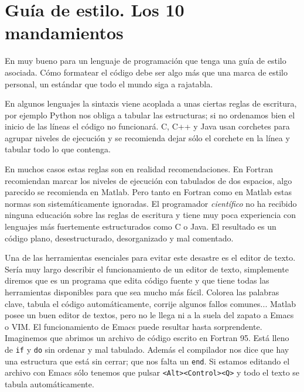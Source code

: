 


\chapter{Guía de estilo. Los 10 mandamientos}


En muy bueno para un lenguaje de programación que tenga una guía de
estilo asociada. Cómo formatear el código debe ser algo más que una
marca de estilo personal, un estándar que todo el mundo siga a
rajatabla.

En algunos lenguajes la sintaxis viene acoplada a unas ciertas reglas
de escritura, por ejemplo Python nos obliga a tabular las estructuras;
si no ordenamos bien el inicio de las líneas el código no funcionará.
C, C++ y Java usan corchetes para agrupar niveles de ejecución y se
recomienda dejar sólo el corchete en la línea y tabular todo lo que
contenga.

En muchos casos estas reglas son en realidad recomendaciones. En
Fortran recomiendan marcar los niveles de ejecución con tabulados de
dos espacios, algo parecido se recomienda en Matlab. Pero tanto en
Fortran como en Matlab estas normas son sistemáticamente ignoradas. El
programador \emph{científico} no ha recibido ninguna educación sobre
las reglas de escritura y tiene muy poca experiencia con lenguajes más
fuertemente estructurados como C o Java. El resultado es un código
plano, desestructurado, desorganizado y mal comentado.

Una de las herramientas esenciales para evitar este desastre es el
editor de texto. Sería muy largo describir el funcionamiento de un
editor de texto, simplemente diremos que es un programa que edita
código fuente y que tiene todas las herramientas disponibles para que
sea mucho más fácil. Colorea las palabras clave, tabula el código
automáticamente, corrije algunos fallos comunes... Matlab posee un
buen editor de textos, pero no le llega ni a la suela del zapato a
Emacs o VIM. El funcionamiento de Emacs puede resultar hasta
sorprendente.  Imaginemos que abrimos un archivo de código escrito en
Fortran 95.  Está lleno de \texttt{if} y \texttt{do} sin ordenar y mal
tabulado.  Además el compilador nos dice que hay una estructura que
está sin cerrar; que nos falta un \texttt{end}. Si estamos editando el
archivo con Emacs sólo tenemos que pulsar \texttt{<Alt><Control><Q>} y
todo el texto se tabula automáticamente.

